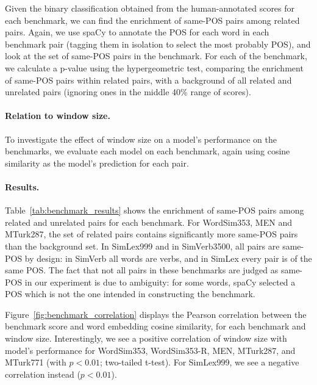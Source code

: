 \documentclass[11pt,a4paper]{article}
\begin{document}
    Given the binary classification obtained from the human-annotated scores
    for each benchmark, we can find the enrichment of same-POS pairs among
    related pairs.
    Again, we use spaCy to annotate the POS for each word in each benchmark
    pair (tagging them in isolation to select the most probably POS),
    and look at the set of same-POS pairs in the benchmark.
    For each of the benchmark, we calculate a p-value using the hypergeometric
    test, comparing the enrichment of same-POS pairs within related pairs,
    with a background of all related and unrelated pairs (ignoring ones in
    the middle 40\% range of scores).
    
    \paragraph{Relation to window size.}
    
    To investigate the effect of window size on a model's performance on the benchmarks,
    we evaluate each model on each benchmark, again using cosine similarity
    as the model's prediction for each pair.
    
    \paragraph{Results.}
    
    Table~\ref{tab:benchmark_results} shows the enrichment of same-POS pairs
    among related and unrelated pairs for each benchmark.
    For WordSim353, MEN and MTurk287, the set of related pairs
    contains significantly more same-POS pairs than the background set.
    In SimLex999 and in SimVerb3500, all pairs are same-POS by design:
    in SimVerb all words are verbs, and in SimLex every pair is of the same POS.
    The fact that not all pairs in these benchmarks are judged as same-POS
    in our experiment is due to ambiguity: for some words, spaCy selected a POS
    which is not the one intended in constructing the benchmark.
    
    Figure~\ref{fig:benchmark_correlation} displays the Pearson correlation
    between the benchmark score and word embedding cosine similarity,
    for each benchmark and window size.
    Interestingly, we see a positive correlation of window size with model's performance
    for WordSim353, WordSim353-R, MEN, MTurk287, and MTurk771 (with $p<0.01$; two-tailed t-test).
    For SimLex999, we see a negative correlation instead ($p<0.01$).
    
    
\end{document}
